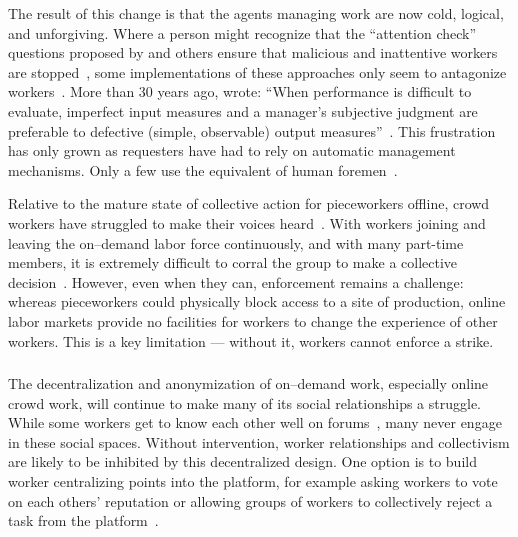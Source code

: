 \documentclass[trackingWork]{subfiles}
\begin{document}
The result of this change is that the agents managing work are now
cold, logical, and unforgiving.
Where a person might recognize that the ``attention check'' questions
proposed by \citeauthor{le2010ensuring} and others ensure that
malicious and inattentive workers are stopped~\cite{le2010ensuring,AAAIW113995},
some implementations of these approaches
only seem to antagonize workers~\cite{takingAHITMcInnis}.
More than 30 years ago, \citeauthor{10.2307/2555446} wrote:
``When performance is difficult to evaluate,
imperfect input measures and
a manager's subjective judgment are preferable to
defective (simple, observable) output measures''~\cite{10.2307/2555446}.
This frustration has only grown as requesters have had to rely on automatic management mechanisms. Only a few use the equivalent of human foremen~\cite{haas2015argonaut,kulkarni2012mobileworks}.

Relative to the mature state of collective action for pieceworkers offline,
crowd workers have struggled to make their voices heard~\cite{dynamo,storiesIraniSilberman,turkopticon}.
With workers joining and leaving the on--demand labor force continuously, and with many part-time members, it is extremely difficult to corral the group to make a collective decision~\cite{dynamo}.
However, even when they can, enforcement remains a challenge: whereas pieceworkers could physically block access to a site of production, online labor markets provide no facilities for workers to change the experience of other workers.
This is a key limitation --- without it, workers cannot enforce a strike.


\subsubsection{\implication}
The decentralization and anonymization of on--demand work, especially online crowd work, will continue to make many of its social relationships a struggle.
While some workers get to know each other well on forums~\cite{martin2014being,crowdcollab}, many never engage in these social spaces.
Without intervention, worker relationships and collectivism are likely to be inhibited by this decentralized design.
One option is to build worker centralizing points into the platform, for example asking workers to vote on each others' reputation or allowing groups of workers to collectively reject a task from the platform~\cite{crowdguilds}.
\end{document}
